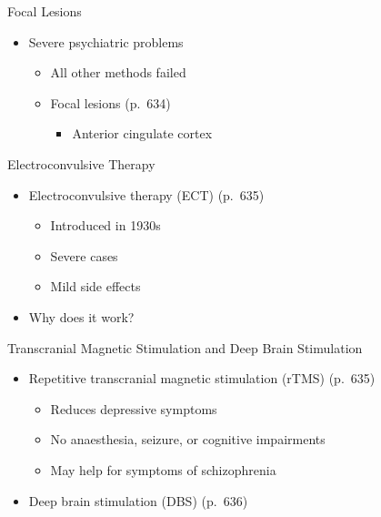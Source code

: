 \documentclass[
]{book}
\providecommand{\tightlist}{%
  \setlength{\itemsep}{0pt}\setlength{\parskip}{0pt}}
\begin{document}
\begin{reflect}
Focal Lesions

\begin{itemize}
\tightlist
\item
  Severe psychiatric problems

  \begin{itemize}
  \tightlist
  \item
    All other methods failed\\
  \item
    Focal lesions (p.~634)

    \begin{itemize}
    \tightlist
    \item
      Anterior cingulate cortex
    \end{itemize}
  \end{itemize}
\end{itemize}

Electroconvulsive Therapy

\begin{itemize}
\tightlist
\item
  Electroconvulsive therapy (ECT) (p.~635)

  \begin{itemize}
  \tightlist
  \item
    Introduced in 1930s\\
  \item
    Severe cases\\
  \item
    Mild side effects\\
  \end{itemize}
\item
  Why does it work?
\end{itemize}

Transcranial Magnetic Stimulation and Deep Brain Stimulation

\begin{itemize}
\tightlist
\item
  Repetitive transcranial magnetic stimulation (rTMS) (p.~635)

  \begin{itemize}
  \tightlist
  \item
    Reduces depressive symptoms\\
  \item
    No anaesthesia, seizure, or cognitive impairments\\
  \item
    May help for symptoms of schizophrenia\\
  \end{itemize}
\item
  Deep brain stimulation (DBS) (p.~636)


\end{itemize}
\end{reflect}
\end{document}
